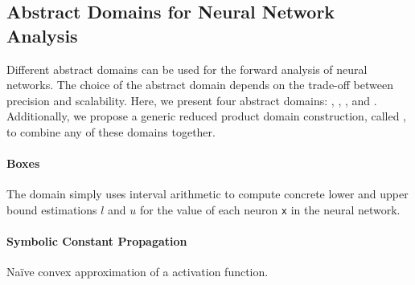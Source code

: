 \subsection{Abstract Domains for Neural Network Analysis}


Different abstract domains can be used for the forward analysis of neural networks.
The choice of the abstract domain depends on the trade-off between precision and scalability.
Here, we present four abstract domains: \boxes{} \cite{Cousot1976,Hickey2001}, \symbolic{} \cite{Wang2018b,Min_e2006b}, \deeppoly{} \cite{Singh2019}, and \neurify{} \cite{Wang2018a}. Additionally, we propose a generic reduced product domain construction, called \reducedproduct, to combine any of these domains together.


\paragraph{Boxes}


The \boxes{} domain simply uses interval arithmetic  to compute concrete lower and upper bound estimations $l$ and $u$ for the value of each neuron \texttt{x} in the neural network.


\paragraph{Symbolic Constant Propagation}

\begin{marginfigure}
  \centering
  \caption{Na\"ive convex approximation of a \relu{} activation function.}
\end{marginfigure}

